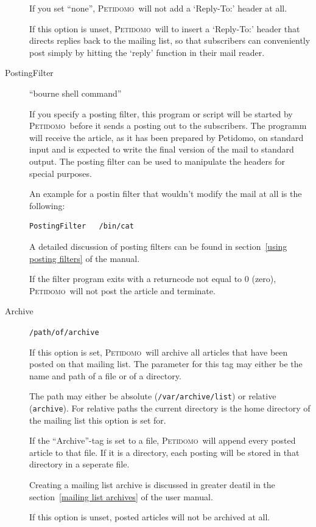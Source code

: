\documentclass[a4paper]{report}
\newcommand{\Petidomo}{{\scshape Peti\-domo}}
\newcommand{\file}[1]{{\tt #1}}
\begin{document}
\begin{description}
If you set ``none'', \Petidomo\ will not add a `Reply-To:' header at
all.

If this option is unset, \Petidomo\ will to insert a `Reply-To:'
header that directs replies back to the mailing list, so that
subscribers can conveniently post simply by hitting the `reply'
function in their mail reader.

\item[PostingFilter] \hfill ``bourne shell command''

If you specify a posting filter, this program or script will be
started by \Petidomo\ before it sends a posting out to the
subscribers. The programm will receive the article, as it has been
prepared by Petidomo, on standard input and is expected to write the
final version of the mail to standard output. The posting filter can
be used to manipulate the headers for special purposes.

An example for a postin filter that wouldn't modify the mail at all is
the following:
\begin{verbatim}
PostingFilter   /bin/cat
\end{verbatim}

A detailed discussion of posting filters can be found in
section~\ref{using posting filters} of the manual.

If the filter program exits with a returncode not equal to 0 (zero),
\Petidomo\ will not post the article and terminate.


\item[Archive] \hfill \file{/path/of/archive}

If this option is set, \Petidomo\ will archive all articles that have
been posted on that mailing list. The parameter for this tag may
either be the name and path of a file or of a directory.

The path may either be absolute (\file{/var/archive/list}) or relative
(\file{archive}). For relative paths the current directory is the home
directory of the mailing list this option is set for.

If the ``Archive''-tag is set to a file, \Petidomo\ will append every
posted article to that file. If it is a directory, each posting will
be stored in that directory in a seperate file.

Creating a mailing list archive is discussed in greater deatil in the
section~\ref{mailing list archives} of the user manual.

If this option is unset, posted articles will not be archived at all.

\end{description}
\end{document}
